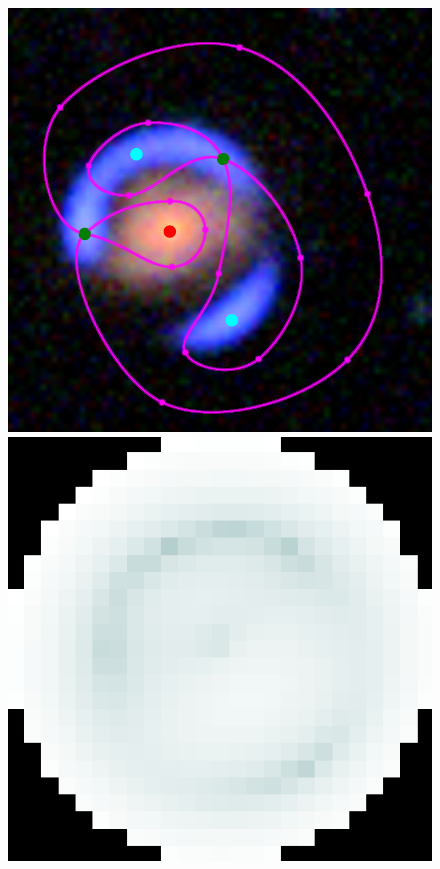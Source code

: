 \begin{figure}
  \centering

  \includegraphics[width=\myplotswidth]{fig/006919_input}
  \includegraphics[width=\myplotswidth]{fig/006919_arr_time} \\

\end{figure}
